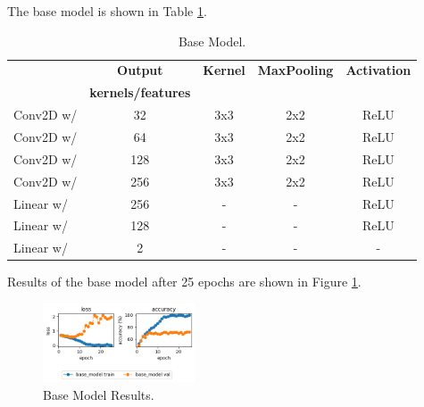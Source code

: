 The base model is shown in Table \ref{tab:base_model}.
\begin{table}[H]
    \vspace*{-0.5cm}
    \centering
    \begin{tabular}{|l|c|c|c|c|}
    \hline
                & \textbf{Output}           & \textbf{Kernel}   & \textbf{MaxPooling}   & \textbf{Activation}   \\ 
                & \textbf{kernels/features} &                   &   &   \\ \hline
    Conv2D w/   & 32                        & 3x3                   & 2x2                   & ReLU                  \\ \hline
    Conv2D w/   & 64                        & 3x3                   & 2x2                   & ReLU                  \\ \hline
    Conv2D w/   & 128                       & 3x3                   & 2x2                   & ReLU                  \\ \hline
    Conv2D w/   & 256                       & 3x3                   & 2x2                   & ReLU                  \\ \hline
    Linear w/   & 256                       & -                     & -                     & ReLU                  \\ \hline
    Linear w/   & 128                       & -                     & -                     & ReLU                  \\ \hline
    Linear w/   & 2                         & -                     & -                     & -                     \\ \hline
    \end{tabular}
    \caption{Base Model.}
    \label{tab:base_model}
    \vspace*{-0.8cm}
\end{table}
Results of the base model after 25 epochs are shown in Figure \ref{fig:base_model_results}.
\begin{figure}[H]
    \vspace*{-0.7cm}
    \centering
    \includegraphics[width=0.4\textwidth]{figures/results_base_model.png}
    \caption{Base Model Results.}
    \label{fig:base_model_results}
    \vspace*{-0.7cm}
\end{figure}

